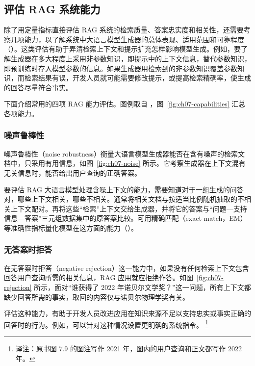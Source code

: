 \subsection{评估 RAG 系统能力}
除了用定量指标直接评估 RAG 系统的检索质量、答案忠实度和相关性，还需要考察几项能力，以了解系统中大语言模型生成器的总体表现、适用范围和可靠程度（）。这类评估有助于弄清检索上下文和提示扩充怎样影响模型生成。例如，要了解生成器在多大程度上采用非参数知识，即提示中的上下文信息，替代参数知识，即预训练时存入模型参数的信息。如果生成器用检索到的非参数知识覆盖参数知识，而检索结果有误，开发人员就可能需要修改提示，或提高检索精确率，使生成的回答尽量符合事实。

下面介绍常用的四项 RAG 能力评估。图例取自 ，图~\ref{fig:ch07-capabilities} 汇总各项能力。

\subsubsection{噪声鲁棒性}
噪声鲁棒性（noise robustness）衡量大语言模型生成器能否在含有噪声的检索文档中，只采用有用信息，如图~\ref{fig:ch07-noise} 所示。它考察生成器在上下文混有无关信息时，能否给出用户查询的正确答案。


\begin{practicaltip}
要评估 RAG 大语言模型处理含噪上下文的能力，需要知道对于一组生成的问答对，哪些上下文相关，哪些不相关。通常将相关文档与按适当比例随机抽取的不相关上下文配对。再将这些“检索”上下文交给生成器，并将它的答案与“问题—支持信息—答案”三元组数据集中的原答案比较。可用精确匹配（exact match，EM）等准确性指标量化模型在这方面的能力（）。
\end{practicaltip}

\subsubsection{无答案时拒答}
在无答案时拒答（negative rejection）这一能力中，如果没有任何检索上下文包含回答用户查询所需的相关信息，RAG 应用就应拒绝作答。如图~\ref{fig:ch07-rejection} 所示，面对“谁获得了 2022 年诺贝尔文学奖？”这一问题，所有上下文都缺少回答所需的事实，取回的内容仅与诺贝尔物理学奖有关。

评估这种能力，有助于开发人员改进应用在知识来源不足以支持忠实或事实正确的回答时的行为。例如，可以针对这种情况设置更明确的系统指令。%
\footnote{译注：原书图 7.9 的图注写作 2021 年，图内的用户查询和正文都写作 2022 年。}


